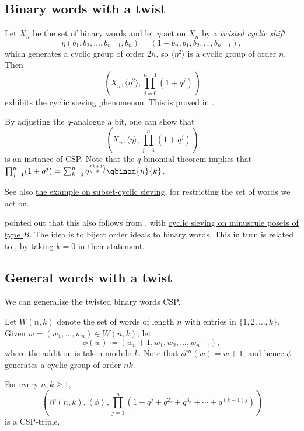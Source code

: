 \subsection[cspBinaryWordsTwist]{Binary words with a twist}

Let $X_n$ be the set of binary words and let $\eta$
act on $X_n$ by a \emph{twisted cyclic shift}
\[
\eta(b_1,b_2,\dotsc,b_{n-1},b_n) = (1-b_n,b_1,b_2,\dotsc,b_{n-1}),
\]
which generates a cyclic group of order $2n$, so $\langle \eta^2 \rangle$ is a cyclic
group of order $n$.
Then
\[
\left(X_n, \langle \eta^2 \rangle, \prod_{j=0}^{n-1}(1+q^j) \right)
\]
exhibits the cyclic sieving phenomenon.  This is proved in
\cite{AlexanderssonLinussonPotka2019}.

By adjusting the $q$-analogue a bit, one can show that
\[
\left(X_n, \langle \eta \rangle, \prod_{j=1}^{n}(1+q^j) \right)
\]
is an instance of CSP. Note that the
\hyperref[qbinomial]{$q$-binomial theorem} implies that
$\prod_{j=1}^{n}(1+q^j) = \sum_{k=0}^n q^{\binom{k+1}{2}} \qbinom{n}{k}$.


See also \hyperref[subsetCyclicSieving]{the example on subset-cyclic sieving},
for restricting the set of words we act on.

 pointed out that this also follows from \cite{RushShi2012},
with \hyperref[cspListPosetsMinuscule]{cyclic sieving on minuscule posets of type $B$}.
The idea is to biject order ideals to binary words.
This in turn is related to \cite[Cor.~8.5]{ReinerStantonWhite2004}, by taking
$k=0$ in their statement.


\subsection[cspWordsTwist]{General words with a twist}

We can generalize the twisted binary words CSP.

\begin{definition}
Let $W(n,k)$ denote the set of words of length $n$ with entries in $\{1,2,\dotsc,k\}$.
Given $w=(w_1,\dotsc,w_n) \in W(n,k)$, let
\[
\phi(w) \coloneqq (w_n+1,w_1,w_2,\dotsc,w_{n-1}),
\]
where the addition is taken modulo $k$.
Note that $\phi^{\circ n}(w) = w+1$, and hence $\phi$ generates a cyclic
group of order $nk$.
\end{definition}

\begin{conjecture}[Alexandersson, 2022]
For every $n,k\geq 1$,
\[
 \left(
W(n,k), \left\langle \phi \right\rangle,
\prod_{j=1}^{n}\left(1+q^j+q^{2j}+q^{3j}+\dotsb+q^{(k-1)j}\right)
 \right)
\]
is a CSP-triple.
\end{conjecture}



